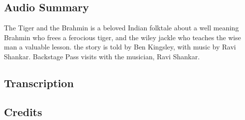 \subsection{Audio Summary}

The Tiger and the Brahmin is a beloved Indian folktale about a well meaning Brahmin who frees a ferocious tiger, and the wiley jackle who teaches the wise man a valuable lesson. the story is told by Ben Kingsley, with music by Ravi Shankar. Backstage Pass visits with the musician, Ravi Shankar.

\subsection{Transcription}

\subsection{Credits}